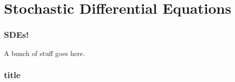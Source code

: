 \section{Stochastic Differential Equations}

\begin{frame}
  \frametitle{SDEs!}

  A bunch of stuff goes here.

\end{frame}

\begin{frame}
  \frametitle{title}
  
\end{frame}

